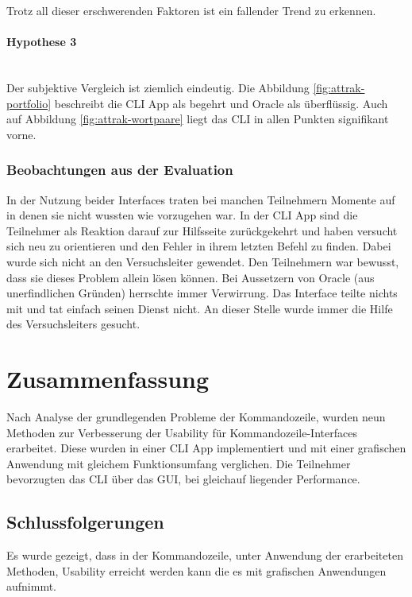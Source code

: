 \documentclass[oneside,bibliography=totocnumbered,BCOR=5mm]{scrbook}
\begin{document}
Trotz all dieser erschwerenden Faktoren ist ein fallender Trend zu erkennen.

\subsubsection{Hypothese 3}
\\
Der subjektive Vergleich ist ziemlich eindeutig. Die Abbildung
\ref{fig:attrak-portfolio} beschreibt die CLI App als begehrt und Oracle als
überflüssig. Auch auf Abbildung \ref{fig:attrak-wortpaare} liegt das CLI in
allen Punkten signifikant vorne.

\subsection{Beobachtungen aus der Evaluation}

In der Nutzung beider Interfaces traten bei manchen Teilnehmern Momente auf in
denen sie nicht wussten wie vorzugehen war. In der CLI App sind die Teilnehmer
als Reaktion darauf zur Hilfsseite zurückgekehrt und haben versucht sich
neu zu orientieren und den Fehler in ihrem letzten Befehl zu finden. Dabei
wurde sich nicht an den Versuchsleiter gewendet. Den Teilnehmern war bewusst,
dass sie dieses Problem allein lösen können. Bei Aussetzern von Oracle (aus
unerfindlichen Gründen) herrschte immer Verwirrung. Das Interface teilte nichts
mit und tat einfach seinen Dienst nicht. An dieser Stelle wurde immer die Hilfe
des Versuchsleiters gesucht.

\chapter{Zusammenfassung}
\label{sec:zusammenfassung}

Nach Analyse der grundlegenden Probleme der Kommandozeile, wurden neun Methoden
zur Verbesserung der Usability für Kommandozeile-Interfaces erarbeitet. Diese
wurden in einer CLI App implementiert und mit einer grafischen Anwendung mit
gleichem Funktionsumfang verglichen. Die Teilnehmer bevorzugten das CLI über das
GUI, bei gleichauf liegender Performance.

\section{Schlussfolgerungen}

Es wurde gezeigt, dass in der Kommandozeile, unter Anwendung der erarbeiteten
Methoden, Usability erreicht werden kann die es mit grafischen Anwendungen
aufnimmt.
\end{document}

